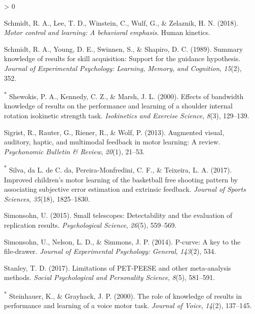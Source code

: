 \documentclass[
  english,
  man, donotrepeattitle,mask,floatsintext]{apa7}
\newlength{\cslhangindent}
\newenvironment{CSLReferences}[2] %
 {%
  \setlength{\parindent}{0pt}
  \ifodd #1 \everypar{\setlength{\hangindent}{\cslhangindent}}\ignorespaces\fi
  \ifnum #2 > 0
  \setlength{\parskip}{#2\baselineskip}
  \fi
 }%
 {}
\begin{document}
\begin{CSLReferences}{1}{0}
\leavevmode\hypertarget{ref-Schmidt2018}{}%
Schmidt, R. A., Lee, T. D., Winstein, C., Wulf, G., \& Zelaznik, H. N. (2018). \emph{Motor control and learning: A behavioral emphasis}. Human kinetics.

\leavevmode\hypertarget{ref-Schmidt1989}{}%
Schmidt, R. A., Young, D. E., Swinnen, S., \& Shapiro, D. C. (1989). Summary knowledge of results for skill acquisition: Support for the guidance hypothesis. \emph{Journal of Experimental Psychology: Learning, Memory, and Cognition}, \emph{15}(2), 352.

\leavevmode\hypertarget{ref-Shewokis2000}{}%
\textsuperscript{*} Shewokis, P. A., Kennedy, C. Z., \& Marsh, J. L. (2000). Effects of bandwidth knowledge of results on the performance and learning of a shoulder internal rotation isokinetic strength task. \emph{Isokinetics and Exercise Science}, \emph{8}(3), 129--139.

\leavevmode\hypertarget{ref-Sigrist2013}{}%
Sigrist, R., Rauter, G., Riener, R., \& Wolf, P. (2013). Augmented visual, auditory, haptic, and multimodal feedback in motor learning: A review. \emph{Psychonomic Bulletin \& Review}, \emph{20}(1), 21--53.

\leavevmode\hypertarget{ref-Silva2017}{}%
\textsuperscript{*} Silva, da L. de C. da, Pereira-Monfredini, C. F., \& Teixeira, L. A. (2017). Improved children's motor learning of the basketball free shooting pattern by associating subjective error estimation and extrinsic feedback. \emph{Journal of Sports Sciences}, \emph{35}(18), 1825--1830.

\leavevmode\hypertarget{ref-Simonsohn2015}{}%
Simonsohn, U. (2015). Small telescopes: Detectability and the evaluation of replication results. \emph{Psychological Science}, \emph{26}(5), 559--569.

\leavevmode\hypertarget{ref-Simonsohn2014}{}%
Simonsohn, U., Nelson, L. D., \& Simmons, J. P. (2014). P-curve: A key to the file-drawer. \emph{Journal of Experimental Psychology: General}, \emph{143}(2), 534.

\leavevmode\hypertarget{ref-Stanley2017}{}%
Stanley, T. D. (2017). Limitations of PET-PEESE and other meta-analysis methods. \emph{Social Psychological and Personality Science}, \emph{8}(5), 581--591.

\leavevmode\hypertarget{ref-Steinhauer2000}{}%
\textsuperscript{*} Steinhauer, K., \& Grayhack, J. P. (2000). The role of knowledge of results in performance and learning of a voice motor task. \emph{Journal of Voice}, \emph{14}(2), 137--145.


\end{CSLReferences}
\end{document}
